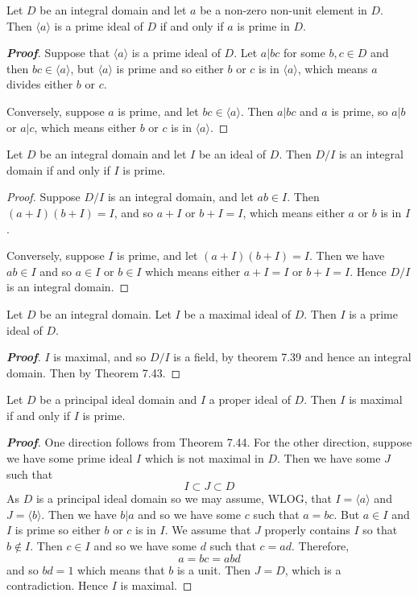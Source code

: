 \begin{theorem} Let $D$ be an integral domain and let $a$ be a non-zero non-unit element in $D$. Then
$\langle a \rangle$ is a prime ideal of $D$ if and only if $a$ is prime in $D$.
\end{theorem}
\begin{proof}[\bf Proof] Suppose that $\langle a \rangle$ is a prime ideal of $D$. Let $a|bc$ for some $b,c \in D$ and then $bc \in \langle a \rangle$, but $\langle a \rangle$ is prime and so either $b$ or $c$ is in $\langle a \rangle$, which means $a$ divides either $b$ or $c$.

Conversely, suppose $a$ is prime, and let $bc \in \langle a \rangle$. Then $a|bc$ and $a$ is prime, so $a|b$ or $a|c$, which means either $b$ or $c$ is in $\langle a \rangle$.
\end{proof}
\begin{theorem} Let $D$ be an integral domain and let $I$ be an ideal of $D$. Then
$D/I$ is an integral domain if and only if $I$ is prime.
\end{theorem}
\begin{proof}
Suppose $D/I$ is an integral domain, and let $ab \in I$. Then $(a+I)(b+I)=I$, and so $a+I$ or $b+I=I$, which means either $a$ or $b$ is in $I$.

Conversely, suppose $I$ is prime, and let $(a+I)(b+I)=I$. Then we have $ab \in I$ and so $a \in I$ or $b \in I$ which means either $a+I=I$ or $b+I=I$. Hence $D/I$ is an integral domain.
\end{proof}
\begin{theorem} Let $D$ be an integral domain. Let $I$ be a maximal ideal of $D$. Then $I$ is a prime ideal of $D$.
\end{theorem}
\begin{proof}[\bf Proof] $I$ is maximal, and so $D/I$ is a field, by theorem 7.39 and hence an integral domain. Then by Theorem 7.43.
\end{proof}
\begin{theorem} Let $D$ be a principal ideal domain and $I$ a proper ideal of $D$. Then $I$ is maximal if and only if $I$ is prime.
\end{theorem}
\begin{proof}[\bf Proof] One direction follows from Theorem 7.44. For the other direction, suppose we have some prime ideal $I$ which is not maximal in $D$. Then we have some $J$ such that
$$I \subset J \subset D$$ As $D$ is a principal ideal domain so we may assume, WLOG, that
$I=\langle a \rangle$ and $J=\langle b \rangle$. Then we have $b|a$ and so we have some $c$ such that
$a=bc$. But $a \in I$ and $I$ is prime so either $b$ or $c$ is in $I$. We assume that $J$ properly contains $I$ so that $b \not \in I$. Then $c \in I$ and so we have some $d$ such that $c=ad$. Therefore,
$$a=bc=abd$$ and so $bd=1$ which means that $b$ is a unit. Then $J=D$, which is a contradiction. Hence $I$ is maximal.
\end{proof}



